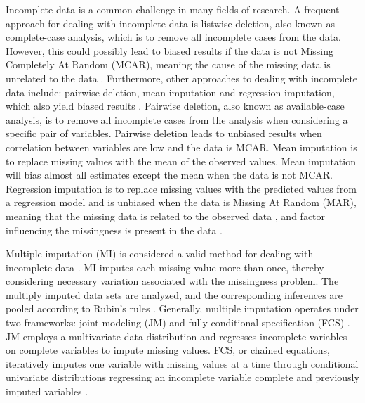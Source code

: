 \documentclass[10pt, a4paper, titlepage]{article}
\begin{document}
Incomplete data is a common challenge in many fields of research. A frequent approach for dealing with incomplete data is listwise deletion, also known as complete-case analysis, which is to remove all incomplete cases from the data. However, this could possibly lead to biased results if the data is not Missing Completely At Random (MCAR), meaning the cause of the missing data is unrelated to the data \citep{buurenFlexibleImputationMissing2018, kang2013, enders2017, austin2021, rubin1976}. Furthermore, other approaches to dealing with incomplete data include: pairwise deletion, mean imputation and regression imputation, which also yield biased results \citep{buurenFlexibleImputationMissing2018}. Pairwise deletion, also known as available-case analysis, is to remove all incomplete cases from the analysis when considering a specific pair of variables. Pairwise deletion leads to unbiased results when correlation between variables are low and the data is MCAR. Mean imputation is to replace missing values with the mean of the observed values. Mean imputation will bias almost all estimates except the mean when the data is not MCAR. Regression imputation is to replace missing values with the predicted values from a regression model and is unbiased when the data is Missing At Random (MAR), meaning that the missing data is related to the observed data \citep{rubin1976}, and factor influencing the missingness is present in the data \citep{buurenFlexibleImputationMissing2018}.


Multiple imputation (MI) is considered a valid method for dealing with incomplete data \citep{mistlerComparisonJointModel2017, buurenFlexibleImputationMissing2018, enders2017, burgette2010, austin2021, audigier2018, vanbuuren2007, grund2021, hughes2014}. MI imputes each missing value more than once, thereby considering necessary variation associated with the missingness problem. The multiply imputed data sets are analyzed, and the corresponding inferences are pooled according to Rubin's rules \citep{buurenFlexibleImputationMissing2018, austin2021, rubin1987}.
Generally, multiple imputation operates under two frameworks: joint modeling (JM) and fully conditional specification (FCS) \citep{mistlerComparisonJointModel2017, buurenFlexibleImputationMissing2018, enders2018, enders2018a, hughes2014}. JM employs a multivariate data distribution and regresses incomplete variables on complete variables to impute missing values. FCS, or chained equations, iteratively imputes one variable with missing values at a time through conditional univariate distributions regressing an incomplete variable complete and previously imputed variables \citep{mistlerComparisonJointModel2017, buurenFlexibleImputationMissing2018, enders2018, enders2018a, hughes2014}.
\end{document}
